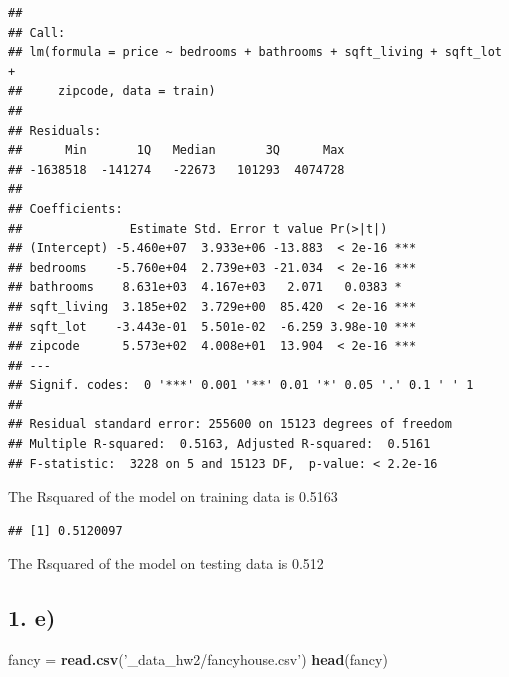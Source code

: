 \documentclass[
]{article}
\newenvironment{Shaded}{\begin{snugshade}}{\end{snugshade}}
\newcommand{\CommentTok}[1]{\textcolor[rgb]{0.56,0.35,0.01}{\textit{#1}}}
\newcommand{\DecValTok}[1]{\textcolor[rgb]{0.00,0.00,0.81}{#1}}
\newcommand{\KeywordTok}[1]{\textcolor[rgb]{0.13,0.29,0.53}{\textbf{#1}}}
\newcommand{\NormalTok}[1]{#1}
\newcommand{\OperatorTok}[1]{\textcolor[rgb]{0.81,0.36,0.00}{\textbf{#1}}}
\newcommand{\StringTok}[1]{\textcolor[rgb]{0.31,0.60,0.02}{#1}}
\begin{document}
\begin{verbatim}
## 
## Call:
## lm(formula = price ~ bedrooms + bathrooms + sqft_living + sqft_lot + 
##     zipcode, data = train)
## 
## Residuals:
##      Min       1Q   Median       3Q      Max 
## -1638518  -141274   -22673   101293  4074728 
## 
## Coefficients:
##               Estimate Std. Error t value Pr(>|t|)    
## (Intercept) -5.460e+07  3.933e+06 -13.883  < 2e-16 ***
## bedrooms    -5.760e+04  2.739e+03 -21.034  < 2e-16 ***
## bathrooms    8.631e+03  4.167e+03   2.071   0.0383 *  
## sqft_living  3.185e+02  3.729e+00  85.420  < 2e-16 ***
## sqft_lot    -3.443e-01  5.501e-02  -6.259 3.98e-10 ***
## zipcode      5.573e+02  4.008e+01  13.904  < 2e-16 ***
## ---
## Signif. codes:  0 '***' 0.001 '**' 0.01 '*' 0.05 '.' 0.1 ' ' 1
## 
## Residual standard error: 255600 on 15123 degrees of freedom
## Multiple R-squared:  0.5163, Adjusted R-squared:  0.5161 
## F-statistic:  3228 on 5 and 15123 DF,  p-value: < 2.2e-16
\end{verbatim}

The Rsquared of the model on training data is 0.5163

\begin{Shaded}
\end{Shaded}

\begin{verbatim}
## [1] 0.5120097
\end{verbatim}

The Rsquared of the model on testing data is 0.512

\hypertarget{e}{%
\subsection{1. e)}\label{e}}

\begin{Shaded}
\begin{Highlighting}[]
\NormalTok{fancy =}\StringTok{ }\KeywordTok{read.csv}\NormalTok{(}\StringTok{'_data_hw2/fancyhouse.csv'}\NormalTok{)}
\KeywordTok{head}\NormalTok{(fancy)}
\end{Highlighting}
\end{Shaded}
\end{document}
